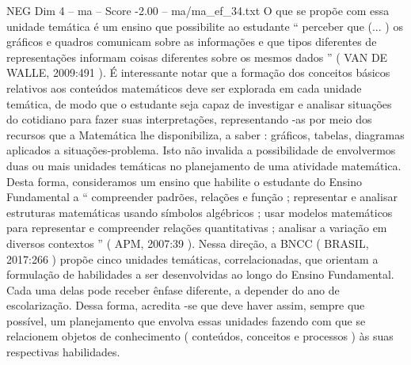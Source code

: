 \begin{textsample}{NEG Dim 4 – ma – Score -2.00 – ma/ma\_ef\_34.txt}
O que se propõe com essa unidade temática é um ensino que possibilite ao estudante “ perceber que (... ) os gráficos e quadros comunicam sobre as informações e que tipos diferentes de representações informam coisas diferentes sobre os mesmos dados ” ( VAN DE WALLE, 2009:491 ).
É interessante notar que a formação dos conceitos básicos relativos aos conteúdos matemáticos deve ser explorada em cada unidade temática, de modo que o estudante seja capaz de investigar e analisar situações do cotidiano para fazer suas interpretações, representando -as por meio dos recursos que a Matemática lhe disponibiliza, a saber : gráficos, tabelas, diagramas aplicados a situações-problema.
Isto não invalida a possibilidade de envolvermos duas ou mais unidades temáticas no planejamento de uma atividade matemática.
Desta forma, consideramos um ensino que habilite o estudante do Ensino Fundamental a “ compreender padrões, relações e função ; representar e analisar estruturas matemáticas usando símbolos algébricos ; usar modelos matemáticos para representar e compreender relações quantitativas ; analisar a variação em diversos contextos ” ( APM, 2007:39 ).
Nessa direção, a BNCC ( BRASIL, 2017:266 ) propõe cinco unidades temáticas, correlacionadas, que orientam a formulação de habilidades a ser desenvolvidas ao longo do Ensino Fundamental.
Cada uma delas pode receber ênfase diferente, a depender do ano de escolarização.
Dessa forma, acredita -se que deve haver assim, sempre que possível, um planejamento que envolva essas unidades fazendo com que se relacionem objetos de conhecimento ( conteúdos, conceitos e processos ) às suas respectivas habilidades.

\end{textsample}
